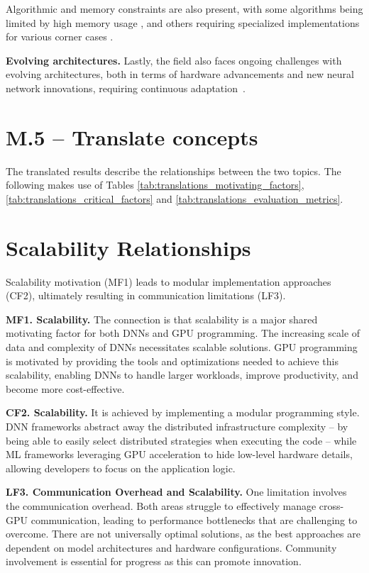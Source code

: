 Algorithmic and memory constraints are also present, with some algorithms being limited by high
memory usage , and others requiring specialized implementations for various corner
cases .

\textbf{Evolving architectures.}
Lastly, the field also faces ongoing challenges with evolving architectures, both in terms of hardware advancements
and new neural network innovations, requiring continuous adaptation~.

\section{M.5 -- Translate concepts}
\label{sec:translate-concepts}
The translated results describe the relationships between the two topics. The following makes use of Tables \ref{tab:translations_motivating_factors},
\ref{tab:translations_critical_factors} and \ref{tab:translations_evaluation_metrics}.




\section*{Scalability Relationships}
Scalability motivation (MF1) leads to modular implementation approaches (CF2), ultimately resulting in communication limitations (LF3).

\textbf{MF1. Scalability.} The connection is that scalability is a major shared motivating factor for both DNNs and GPU programming.
The increasing scale of data and complexity of DNNs necessitates scalable solutions. GPU programming is
motivated by providing the tools and optimizations needed to achieve this scalability, enabling DNNs to
handle larger workloads, improve productivity, and become more cost-effective.

\textbf{CF2. Scalability.} It is achieved by implementing a modular programming style. DNN frameworks
abstract away the distributed infrastructure complexity -- by being able to easily select distributed
strategies when executing the code -- while ML frameworks leveraging GPU acceleration to hide
low-level hardware details, allowing developers to focus on the application logic.

\textbf{LF3. Communication Overhead and Scalability.} One limitation involves the communication overhead. Both areas struggle
to effectively manage cross-GPU communication, leading to performance bottlenecks that are challenging to overcome. There are not universally
optimal solutions, as the best approaches are dependent on model architectures and hardware configurations.
Community involvement is essential for progress as this can promote innovation.

